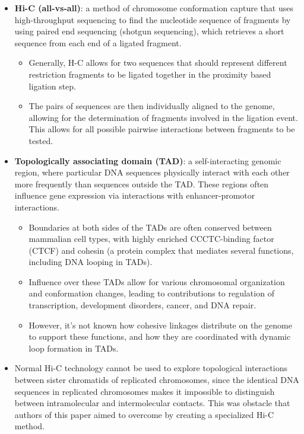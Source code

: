 \documentclass[plain,basic]{inVerba-notes}
\begin{document}
    \begin{itemize}
    \item \textbf{Hi-C (all-vs-all)}: a method of chromosome conformation capture that uses high-throughput sequencing to find the nucleotide sequence of fragments by using paired end sequencing (shotgun sequencing), which retrieves a short sequence from each end of a ligated fragment. 
        \begin{itemize}
            \item Generally, H-C allows for two sequences that should represent different restriction fragments to be ligated together in the proximity based ligation step.
            \item The pairs of sequences are then individually aligned to the genome, allowing for the determination of fragments involved in the ligation event. This allows for all possible pairwise interactions between fragments to be tested.
        \end{itemize}
    \item \textbf{Topologically associating domain (TAD)}: a self-interacting genomic region, where particular DNA sequences physically interact with each other more frequently than sequences outside the TAD\@. These regions often influence gene expression via interactions with enhancer-promotor interactions.
        \begin{itemize}
            \item Boundaries at both sides of the TADs are often conserved between mammalian cell types, with highly enriched CCCTC-binding factor (CTCF) and cohesin (a protein complex that mediates several functions, including DNA looping in TADs). 
            \item Influence over these TADs allow for various chromosomal organization and conformation changes, leading to contributions to regulation of transcription, development disorders, cancer, and DNA repair.
            \item However, it's not known how cohesive linkages distribute on the genome to support these functions, and how they are coordinated with dynamic loop formation in TADs.
        \end{itemize}
    \item Normal Hi-C technology cannot be used to explore topological interactions between sister chromatids of replicated chromosomes, since the identical DNA sequences in replicated chromosomes makes it impossible to distinguish between intramolecular and intermolecular contacts. This was obstacle that authors of this paper aimed to overcome by creating a specialized Hi-C method. 
\end{itemize}
\end{document}
